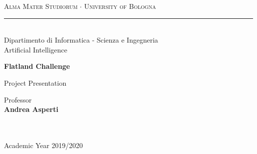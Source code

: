 \documentclass[11pt, a4paper, hidelinks]{report}
\begin{document}
\begin{titlepage}

\begin{center}
{{\Large{\textsc{Alma Mater Studiorum $\cdot$ University of Bologna}}}}
\rule[0.1cm]{15.8cm}{0.25mm}
\\\vspace{3mm}
%
%
{\Large{Dipartimento di Informatica - Scienza e Ingegneria\\
Artificial Intelligence}}


\end{center}

\vspace{20mm}

\begin{center}{
%
%
	{\LARGE{\textbf{Flatland Challenge}}}}
\end{center}

\vspace{15mm}

{\begin{center}
	 \large{Project Presentation}
\end{center}}

\vspace{32mm} \par \noindent

\begin{minipage}[t]{0.47\textwidth}
%
%
{\large{ Professor \vspace{2mm}\\{\textbf{Andrea Asperti}
}\\\\\\}}
\end{minipage}
%
\hfill
%
\begin{minipage}[t]{0.47\textwidth}
\end{minipage}

\vspace{31mm}

\begin{center}
Academic Year {2019/2020}
\end{center}

\end{titlepage}

{\tableofcontents}
\thispagestyle{empty}

\newpage
\setcounter{page}{1}
\end{document}
